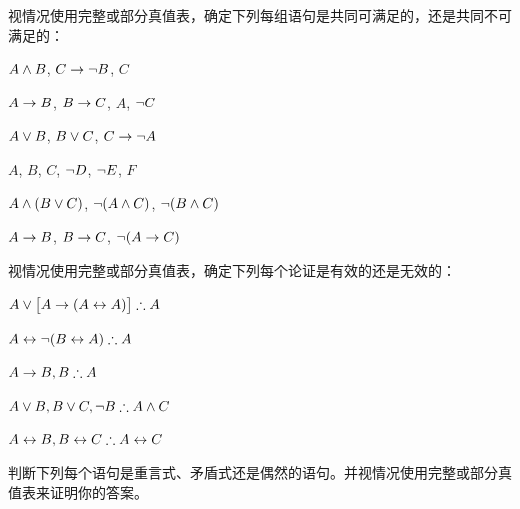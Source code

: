 \problempart
\label{pr.TT.satisfiable4}
视情况使用完整或部分真值表，确定下列每组语句是共同可满足的，还是共同不可满足的：


\begin{compactlist}
\item $A \wedge B$, $C\rightarrow \neg B$, $C$ %
\item $A\rightarrow B$, $B\rightarrow C$, $A$, $\neg C$ %
\item $A \vee B$, $B\vee C$, $C\rightarrow \neg A$ %
\item $A$, $B$, $C$, $\neg D$, $\neg E$, $F$ %
\item $A \wedge (B \vee C)$, $\neg(A \wedge C)$, $\neg(B \wedge C)$ %
\item $A \rightarrow B$, $B \rightarrow C$, $\neg(A \rightarrow C)$ %
\end{compactlist}

\problempart
\label{pr.TT.valid4}
视情况使用完整或部分真值表，确定下列每个论证是有效的还是无效的：


\begin{compactlist}
\item $A\eor\bigl[A\eif(A\eiff A)\bigr] \therefore A$ %
\item $A\eiff\enot(B\eiff A) \therefore A$ %
\item $A\eif B, B \therefore A$ %
\item $A\eor B, B\eor C, \enot B \therefore A \eand C$ %
\item $A\eiff B, B\eiff C \therefore A\eiff C$ %
\end{compactlist}

\problempart
\label{pr.TT.TTorC3}
判断下列每个语句是重言式、矛盾式还是偶然的语句。并视情况使用完整或部分真值表来证明你的答案。


